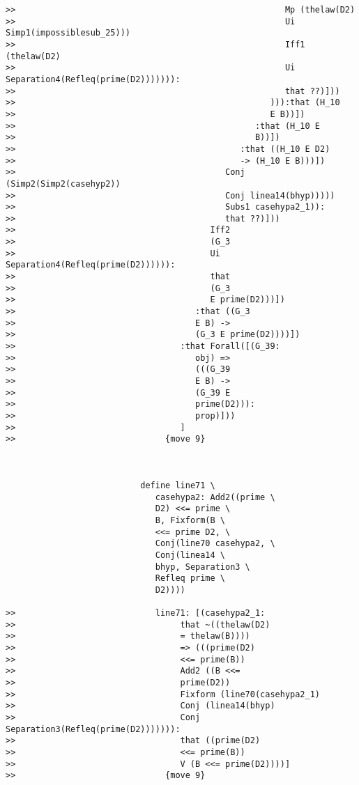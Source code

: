 \documentclass[12pt]{article}
\begin{document}
\begin{verbatim}
>>                                                      Mp (thelaw(D2)
>>                                                      Ui Simp1(impossiblesub_25)))
>>                                                      Iff1 (thelaw(D2)
>>                                                      Ui Separation4(Refleq(prime(D2))))))):
>>                                                      that ??)]))
>>                                                   ))):that (H_10
>>                                                   E B))])
>>                                                :that (H_10 E
>>                                                B))])
>>                                             :that ((H_10 E D2)
>>                                             -> (H_10 E B)))])
>>                                          Conj (Simp2(Simp2(casehyp2))
>>                                          Conj linea14(bhyp)))))
>>                                          Subs1 casehypa2_1)):
>>                                          that ??)]))
>>                                       Iff2
>>                                       (G_3
>>                                       Ui Separation4(Refleq(prime(D2)))))):
>>                                       that
>>                                       (G_3
>>                                       E prime(D2)))])
>>                                    :that ((G_3
>>                                    E B) ->
>>                                    (G_3 E prime(D2))))])
>>                                 :that Forall([(G_39:
>>                                    obj) =>
>>                                    (((G_39
>>                                    E B) ->
>>                                    (G_39 E
>>                                    prime(D2))):
>>                                    prop)]))
>>                                 ]
>>                              {move 9}



                           define line71 \
                              casehypa2: Add2((prime \
                              D2) <<= prime \
                              B, Fixform(B \
                              <<= prime D2, \
                              Conj(line70 casehypa2, \
                              Conj(linea14 \
                              bhyp, Separation3 \
                              Refleq prime \
                              D2))))

>>                            line71: [(casehypa2_1:
>>                                 that ~((thelaw(D2)
>>                                 = thelaw(B))))
>>                                 => (((prime(D2)
>>                                 <<= prime(B))
>>                                 Add2 ((B <<=
>>                                 prime(D2))
>>                                 Fixform (line70(casehypa2_1)
>>                                 Conj (linea14(bhyp)
>>                                 Conj Separation3(Refleq(prime(D2))))))):
>>                                 that ((prime(D2)
>>                                 <<= prime(B))
>>                                 V (B <<= prime(D2))))]
>>                              {move 9}




\end{verbatim}
\end{document}
